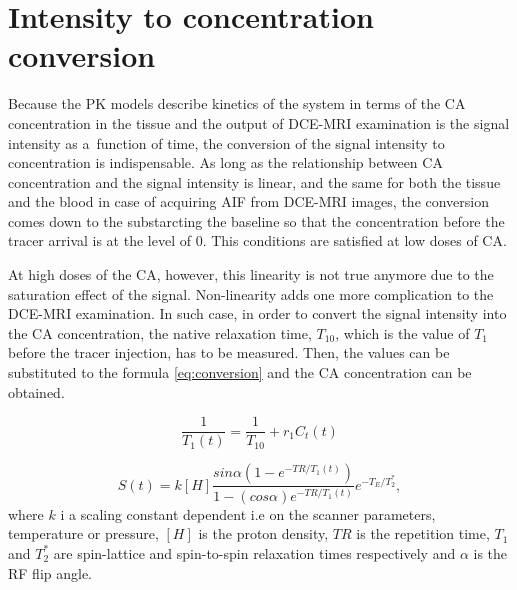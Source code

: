 \section{Intensity to concentration conversion}
Because the PK models describe kinetics of the system in terms of the CA concentration in the tissue and the output of DCE-MRI examination is the signal intensity as a~function of time, the conversion of the signal intensity to concentration is indispensable. 
As long as the relationship between CA concentration and the signal intensity  is linear, and the same for both the tissue and the blood in case of acquiring AIF from DCE-MRI images, the conversion comes down to the substarcting the baseline so that the concentration before the tracer arrival is at the level of 0. This conditions are satisfied at low doses of CA.

At high doses of the CA, however, this linearity is not true anymore due to the saturation effect of the signal. Non-linearity adds one more complication to the DCE-MRI examination. In such case, in order to convert the signal intensity into the CA concentration, the native relaxation time, $T_{10}$, which is the value of $T_1$ before the tracer injection, has to be measured. Then, the values can be substituted to the formula \ref{eq:conversion} and the CA concentration can be obtained.
 
 \begin{equation}
 \frac{1}{T_1(t)} = \frac{1}{T_{10}}+r_1C_t(t)
 \label{eq:conversion}
 \end{equation}

 \begin{equation}
 S(t)  = k[H]\frac{sin\alpha(1-e^{-TR/T_1(t)})}      {1-(cos\alpha)e^{-TR/T_1(t)}}e^{-T_E/T_2^*},
 \label{eq:conversion2}
 \end{equation}
where $k$ i a scaling constant dependent i.e on the scanner parameters, temperature or pressure, $[H]$ is the proton density, $TR$ is the repetition time, $T_1$ and $T_2^*$ are spin-lattice and spin-to-spin relaxation times respectively and $\alpha$ is the RF flip angle.   

